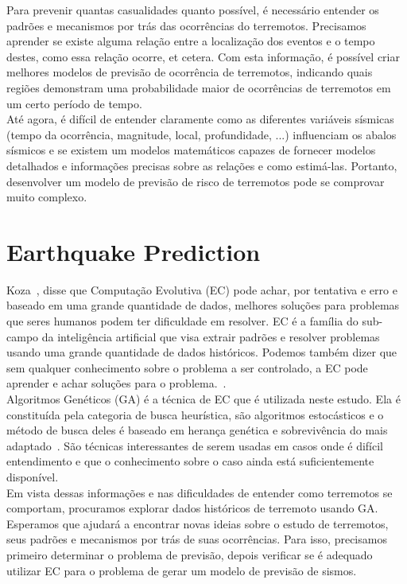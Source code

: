 Para prevenir quantas casualidades quanto possível, é necessário entender os padrões e mecanismos por trás das ocorrências do terremotos. Precisamos aprender se existe alguma relação entre a localização dos eventos e o tempo destes, como essa relação ocorre, et cetera. Com esta informação, é possível criar melhores modelos de previsão de ocorrência de terremotos, indicando quais regiões demonstram uma probabilidade maior de ocorrências de terremotos em um certo período de tempo.\\

Até agora, é difícil de entender claramente como as diferentes variáveis sísmicas (tempo da ocorrência, magnitude, local, profundidade, ...) influenciam os abalos sísmicos e se existem um modelos matemáticos capazes de fornecer modelos detalhados e informações precisas sobre as relações e como estimá-las. Portanto, desenvolver um modelo de previsão de risco de terremotos pode se comprovar muito complexo.\\


\section{Earthquake Prediction}
Koza~\cite{Koza2003}, disse que Computação Evolutiva (EC) pode achar, por tentativa e erro e baseado em uma grande quantidade de dados, melhores soluções para problemas que seres humanos podem ter dificuldade em resolver. EC é a família do sub-campo da inteligência artificial que visa extrair padrões e resolver problemas usando uma grande quantidade de dados históricos. Podemos também dizer que sem qualquer conhecimento sobre o problema a ser controlado, a EC pode aprender e achar soluções para o problema.~\cite{Michie94machinelearning}.\\

Algoritmos Genéticos (GA) é a técnica de EC que é utilizada neste estudo. Ela é constituída pela categoria de busca heurística, são algoritmos estocásticos e o método de busca deles é baseado em herança genética e sobrevivência do mais adaptado~\cite{michalewicz1996heuristic}. São técnicas interessantes de serem usadas em casos onde é difícil entendimento e que o conhecimento sobre o caso ainda está suficientemente disponível.\\

Em vista dessas informações e nas dificuldades de entender como terremotos se comportam, procuramos explorar dados históricos de terremoto usando GA. Esperamos que ajudará a encontrar novas ideias sobre o estudo de terremotos, seus padrões e mecanismos por trás de suas ocorrências. Para isso, precisamos primeiro determinar o problema de previsão, depois verificar se é adequado utilizar EC para o problema de gerar um modelo de previsão de sismos.\\

